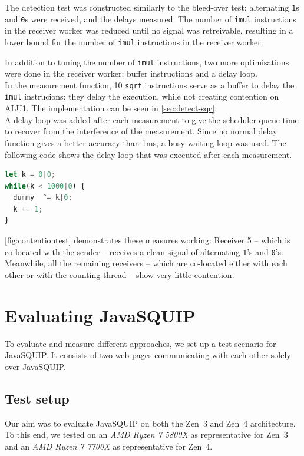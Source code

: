 \documentclass[11pt,
  titlepage=false,
]{scrreprt}
\begin{document}
The detection test was constructed similarly to the bleed-over test:
alternating \texttt{1}s and \texttt{0}s were received, and the delays measured.
The number of \texttt{imul} instructions in the receiver worker was reduced until no signal was retreivable,
resulting in a lower bound for the number of \texttt{imul} instructions in the receiver worker.

In addition to tuning the number of \texttt{imul} instructions, two more optimisations were done in the receiver worker:
buffer instructions and a delay loop. \\
In the measurement function, 10 \texttt{sqrt} instructions serve as a buffer to delay the \texttt{imul} instrucions:
they delay the execution, while not creating contention on ALU1.
The implementation can be seen in \ref{sec:detect-sqc}.\\
A delay loop was added after each measurement to give the scheduler queue time to recover from the interference of the measurement.
Since no normal delay function gives a better accuracy than 1ms, a busy-waiting loop was used.
The following code shows the delay loop that was executed after each measurement.
\begin{lstlisting}[language=JavaScript]
let k = 0|0;
while(k < 1000|0) {
  dummy  ^= k|0;
  k += 1;
}
\end{lstlisting}

\ref{fig:contentiontest} demonstrates these measures working:
Receiver 5 -- which is co-located with the sender -- receives a clean signal of alternating \texttt{1}'s and \texttt{0}'s.
Meanwhile, all the remaining receivers -- which are co-located either with each other or with the counting thread -- show very little contention.

\chapter{Evaluating JavaSQUIP}
\label{ch:evaluation}

To evaluate and measure different approaches, we set up a test scenario for JavaSQUIP.
It consists of two web pages communicating with each other solely over JavaSQUIP.

\section {Test setup}
\label{sec:testsetup}
Our aim was to evaluate JavaSQUIP on both the Zen~3 and Zen~4 architecture.
To this end, we tested on an \textit{AMD Ryzen 7 5800X} as representative for Zen~3 and an \textit{AMD Ryzen 7 7700X} as representative for Zen~4.
\end{document}
